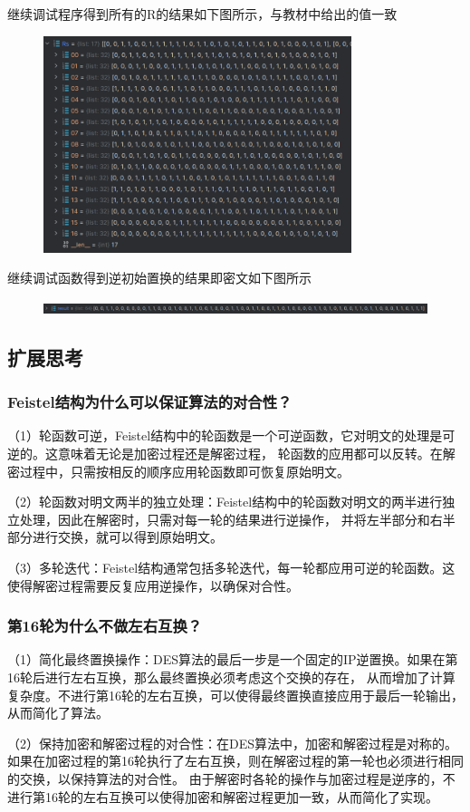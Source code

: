 \documentclass[a4paper,11pt,UTF8]{ctexart}
\newcommand{\bottomcaption}{%
\setlength{\abovecaptionskip}{6pt}%
\setlength{\belowcaptionskip}{6pt}%
\caption}
\newcommand{\xiaowuhao}{\fontsize{9pt}{\baselineskip}\selectfont}   %
\begin{document}
            继续调试程序得到所有的R的结果如下图所示，与教材中给出的值一致
            \begin{figure}[H]
                \centering
                \includegraphics[width=9cm]{dR.png}
                \bottomcaption{\xiaowuhao{R的值}}
            \end{figure}
            继续调试函数得到逆初始置换的结果即密文如下图所示
            \begin{figure}[H]
                \centering
                \includegraphics[width=15cm]{明文.png}
                \bottomcaption{\xiaowuhao{64位明文}}
            \end{figure}

    \subsection{扩展思考}
        \subsubsection{Feistel结构为什么可以保证算法的对合性？}
            （1）轮函数可逆，Feistel结构中的轮函数是一个可逆函数，它对明文的处理是可逆的。这意味着无论是加密过程还是解密过程，
            轮函数的应用都可以反转。在解密过程中，只需按相反的顺序应用轮函数即可恢复原始明文。\par
            （2）轮函数对明文两半的独立处理：Feistel结构中的轮函数对明文的两半进行独立处理，因此在解密时，只需对每一轮的结果进行逆操作，
            并将左半部分和右半部分进行交换，就可以得到原始明文。\par
            （3）多轮迭代：Feistel结构通常包括多轮迭代，每一轮都应用可逆的轮函数。这使得解密过程需要反复应用逆操作，以确保对合性。
        \subsubsection{第16轮为什么不做左右互换？}
            （1）简化最终置换操作：DES算法的最后一步是一个固定的IP逆置换。如果在第16轮后进行左右互换，那么最终置换必须考虑这个交换的存在，
            从而增加了计算复杂度。不进行第16轮的左右互换，可以使得最终置换直接应用于最后一轮输出，从而简化了算法。\par
            （2）保持加密和解密过程的对合性：在DES算法中，加密和解密过程是对称的。如果在加密过程的第16轮执行了左右互换，则在解密过程的第一轮也必须进行相同的交换，以保持算法的对合性。
            由于解密时各轮的操作与加密过程是逆序的，不进行第16轮的左右互换可以使得加密和解密过程更加一致，从而简化了实现。\par
\end{document}
